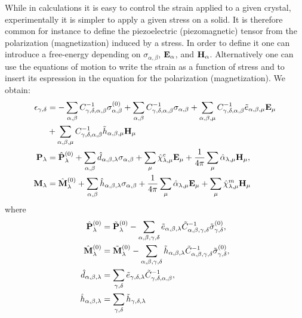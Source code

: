 \documentclass[12pt,a4paper]{article}
\begin{document}
\newpage
{\color{orange}
While in calculations it is easy to control the strain applied to
a given crystal, experimentally it is simpler to apply a given stress
on a solid. It is therefore common for instance to define the 
piezoelectric (piezomagnetic) tensor from the polarization 
(magnetization) induced by a stress. In order to define it one 
can introduce a free-energy depending on $\sigma_{\alpha,\beta}$,
${\bf E}_\alpha$, and ${\bf H}_\alpha$. Alternatively one can use the
equations of motion to write the strain as a function of stress and
to insert its espression in the equation for the polarization
(magnetization). We obtain:
\begin{align}
\epsilon_{\gamma,\delta} &=
- \sum_{\alpha,\beta} 
C^{-1}_{\gamma,\delta,\alpha,\beta} \sigma^{(0)}_{\alpha,\beta} 
+ \sum_{\alpha,\beta} 
C^{-1}_{\gamma,\delta,\alpha,\beta} \sigma_{\alpha,\beta} 
+ \sum_{\alpha,\beta,\mu} 
C^{-1}_{\gamma,\delta,\alpha,\beta} \tilde e_{\alpha,\beta,\mu} {\bf E}_\mu 
\nonumber \\
&+ \sum_{\alpha,\beta,\mu} 
C^{-1}_{\gamma,\delta,\alpha,\beta} \tilde h_{\alpha,\beta,\mu} {\bf H}_\mu 
\\
{\bf P}_{\lambda}&= \hat {\bf P}^{(0)}_{\lambda}
+\sum_{\alpha,\beta} \hat d_{\alpha,\beta,\lambda} 
\sigma_{\alpha,\beta} +
\sum_{\mu} 
\hat \chi^e_{\lambda,\mu}
{\bf E}_{\mu} +
{1\over 4 \pi}\sum_{\mu} \hat \alpha_{\lambda,\mu} 
{\bf H}_{\mu}, \\
{\bf M}_{\lambda}&= \hat {\bf M}^{(0)}_{\lambda}
+\sum_{\alpha,\beta} \hat h_{\alpha,\beta,\lambda} 
\sigma_{\alpha,\beta} +
{1\over 4 \pi} \sum_{\mu} \hat \alpha_{\lambda,\mu} 
{\bf E}_{\mu}+
\sum_{\mu} 
\hat \chi^m_{\lambda,\mu}
{\bf H}_{\mu}
\end{align} 
where
\begin{align}
\hat {\bf P}^{(0)}_{\lambda}&= \tilde {\bf P}^{(0)}_{\lambda}
-\sum_{\alpha,\beta,\gamma,\delta} \tilde e_{\alpha,\beta,\lambda}
\tilde C^{-1}_{\alpha,\beta,\gamma,\delta} 
\tilde \sigma^{(0)}_{\gamma,\delta}, \\
\hat {\bf M}^{(0)}_{\lambda}&= \tilde {\bf M}^{(0)}_{\lambda}
-\sum_{\alpha,\beta,\gamma,\delta} \tilde h_{\alpha,\beta,\lambda}
\tilde C^{-1}_{\alpha,\beta,\gamma,\delta} 
\tilde \sigma^{(0)}_{\gamma,\delta}, \\
\hat d_{\alpha,\beta,\lambda}&= \sum_{\gamma,\delta} 
\tilde e_{\gamma,\delta,\lambda} 
\tilde C^{-1}_{\gamma,\delta,\alpha,\beta}, \\
\hat h_{\alpha,\beta,\lambda}&= \sum_{\gamma,\delta} 
\tilde h_{\gamma,\delta,\lambda} 

\end{align}}
\end{document}
